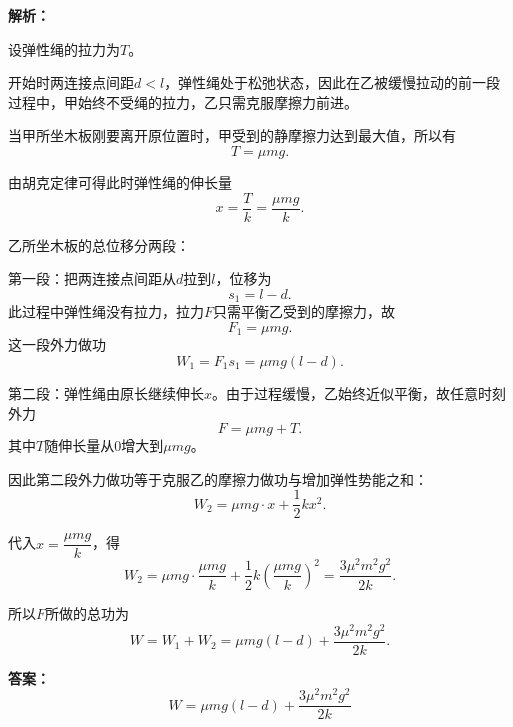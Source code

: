 \documentclass[a4paper,10pt]{ctexart}
\begin{document}
\begin{center}
\end{center}	

\noindent \textbf{解析：}

设弹性绳的拉力为$T$。

开始时两连接点间距$d<l$，弹性绳处于松弛状态，因此在乙被缓慢拉动的前一段过程中，甲始终不受绳的拉力，乙只需克服摩擦力前进。

当甲所坐木板刚要离开原位置时，甲受到的静摩擦力达到最大值，所以有
\[
T=\mu mg.
\]

由胡克定律可得此时弹性绳的伸长量
\[
x=\frac{T}{k}=\frac{\mu mg}{k}.
\]

乙所坐木板的总位移分两段：

第一段：把两连接点间距从$d$拉到$l$，位移为
\[
s_1=l-d.
\]
此过程中弹性绳没有拉力，拉力$F$只需平衡乙受到的摩擦力，故
\[
F_1=\mu mg.
\]
这一段外力做功
\[
W_1=F_1s_1=\mu mg(l-d).
\]

第二段：弹性绳由原长继续伸长$x$。由于过程缓慢，乙始终近似平衡，故任意时刻外力
\[
F=\mu mg+T.
\]
其中$T$随伸长量从$0$增大到$\mu mg$。

因此第二段外力做功等于克服乙的摩擦力做功与增加弹性势能之和：
\[
W_2=\mu mg\cdot x+\frac{1}{2}kx^2.
\]

代入$x=\dfrac{\mu mg}{k}$，得
\[
W_2=\mu mg\cdot \frac{\mu mg}{k}+\frac{1}{2}k\left(\frac{\mu mg}{k}\right)^2
=\frac{3\mu^2m^2g^2}{2k}.
\]

所以$F$所做的总功为
\[
W=W_1+W_2=\mu mg(l-d)+\frac{3\mu^2m^2g^2}{2k}.
\]

\noindent \textbf{答案：}
\[
\boxed{W=\mu mg(l-d)+\frac{3\mu^2m^2g^2}{2k}}
\]
\end{document}
